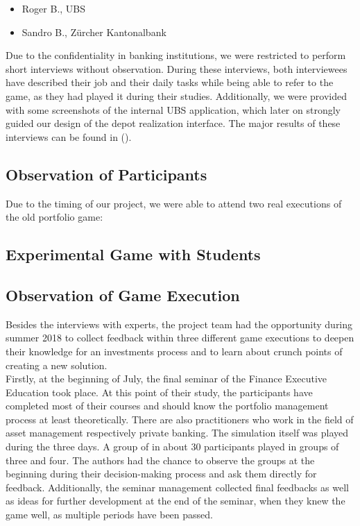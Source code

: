 \begin{itemize}
  \item Roger B., UBS
  \item Sandro B., Zürcher Kantonalbank
\end{itemize}

Due to the confidentiality in banking institutions, we were restricted to perform short interviews without observation. During these interviews, both interviewees have described their job and their daily tasks while being able to refer to the game, as they had played it during their studies. Additionally, we were provided with some screenshots of the internal UBS application, which later on strongly guided our design of the depot realization interface. The major results of these interviews can be found in ().


\subsection{Observation of Participants}
Due to the timing of our project, we were able to attend two real executions of the old portfolio game:
\begin{itemize}

\end{itemize}



\subsection{Experimental Game with Students}


\subsection{Observation of Game Execution}
Besides the interviews with experts, the project team had the opportunity during summer 2018 to collect feedback within three different game executions to deepen their knowledge for an investments process and to learn about crunch points of creating a new solution. \\

Firstly, at the beginning of July, the final seminar of the Finance Executive Education took place. At this point of their study, the participants have completed most of their courses and should know the portfolio management process at least theoretically. There are also practitioners who work in the field of asset management respectively private banking. The simulation itself was played during the three days. A group of in about 30 participants played in groups of three and four. The authors had the chance to observe the groups at the beginning during their decision-making process and ask them directly for feedback. Additionally, the seminar management collected final feedbacks as well as ideas for further development at the end of the seminar, when they knew the game well, as multiple periods have been passed. \\

